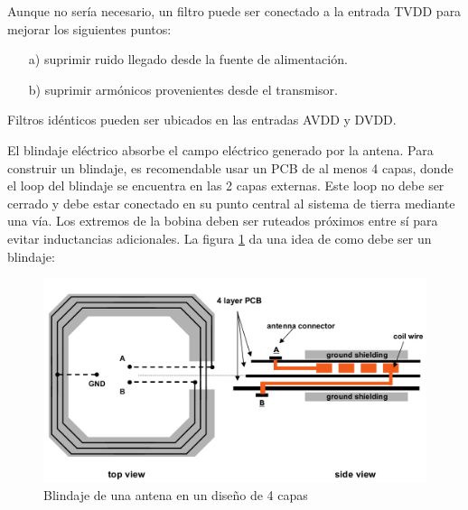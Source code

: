 \bigskip
{}

\bigskip
Aunque no sería necesario, un filtro puede ser conectado a la entrada TVDD para mejorar los siguientes puntos:

\begin{itemize}
\item[a)] suprimir ruido llegado desde la fuente de alimentación.
\item[b)] suprimir armónicos provenientes desde el transmisor.
\end{itemize}

Filtros idénticos pueden ser ubicados en las entradas AVDD y DVDD.

\bigskip
{}

\bigskip
El blindaje eléctrico absorbe el campo eléctrico generado por la antena. Para construir un blindaje, es recomendable usar un PCB de al menos 4 capas, donde el loop del blindaje se encuentra en las 2 capas externas. Este loop no debe ser cerrado y debe estar conectado en su punto central al sistema de tierra mediante una vía. Los extremos de la bobina deben ser ruteados próximos entre sí para evitar inductancias adicionales.  La figura \ref{Fig:blindaje} da una idea de como debe ser un blindaje: 


\begin{figure}[H]
\centering
  \begin{center}
  \includegraphics[scale=.3]{Imagenes/anexo3.png} 
  \end{center}
  \caption{Blindaje de una antena en un diseño de 4 capas}\label{Fig:blindaje} 
\end{figure}

